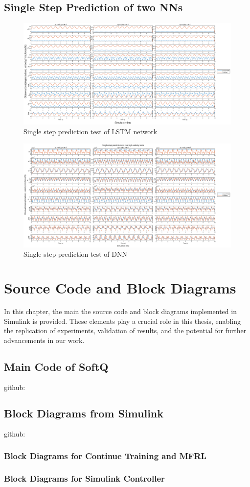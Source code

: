 \section{Single Step Prediction of two NNs}
\begin{figure}[htb]
    \centering
    \includegraphics[width=\linewidth]{img/AppA/lstm_pred.eps}
    \caption{Single step prediction test of LSTM network}
    \label{fig:lstm_test}
\end{figure}

\begin{figure}[htb]
    \centering
    \includegraphics[width=\linewidth]{img/AppA/model_all.eps}
    \caption{Single step prediction test of DNN}
    \label{fig:DNN_test}
\end{figure}



\chapter{Source Code and Block Diagrams}
In this chapter, the main the source code and block diagrams implemented in Simulink is provided. These elements play a crucial role in this thesis, enabling the replication of experiments, validation of results, and the potential for further advancements in our work.


\section{Main Code of SoftQ}
github: 


\section{Block Diagrams from Simulink}
github: 


% 
\subsection{Block Diagrams for Continue Training and MFRL}

\subsection{Block Diagrams for Simulink Controller}